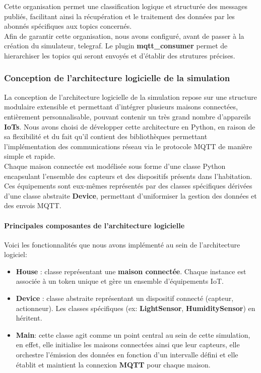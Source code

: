 \documentclass[10pt, a4paper]{report}
\begin{document}
	Cette organisation permet une classification logique et structurée des messages publiés, facilitant ainsi la récupération et le traitement des données par les abonnés spécifiques aux topics concernés.\\
	
	Afin de garantir cette organisation, nous avons configuré, avant de passer à la création du simulateur, telegraf. Le plugin \textbf{mqtt\_consumer} permet de hierarchiser les topics qui seront envoyés et d'établir des strutures précises.
	\subsubsection{Conception de l'architecture logicielle de la simulation}
	La conception de l'architecture logicielle de la simulation repose sur une structure modulaire extensible et permettant d'intégrer plusieurs maisons connectées, entièrement personnalisable, pouvant contenir un très grand nombre d'appareils \textbf{IoTs}. Nous avons choisi de développer cette architecture en Python, en raison de sa flexibilité et du fait qu'il contient des bibliothèques permettant l'implémentation des communications réseau via le protocole MQTT de manière simple et rapide.\\
	
	Chaque maison connectée est modélisée sous forme d'une classe Python encapsulant l'ensemble des capteurs et des dispositifs présents dans l'habitation. Ces équipements sont eux-mêmes représentés par des classes spécifiques dérivées d'une classe abstraite \textbf{Device}, permettant d'uniformiser la gestion des données et des envois MQTT.\\
	
	\paragraph{Principales composantes de l'architecture logicielle\\}
		Voici les fonctionnalités que nous avons implémenté au sein de l'architecture logiciel:

	\begin{itemize}
		\item \textbf{House} : classe représentant une \textbf{maison connectée}. Chaque instance est associée à un token unique et gère un ensemble d'équipements IoT.
		\item \textbf{Device} : classe abstraite représentant un dispositif connecté (capteur, actionneur). Les classes spécifiques (ex: \textbf{LightSensor}, \textbf{HumiditySensor}) en héritent.
		\item \textbf{Main}: cette classe agit comme un point central au sein de cette simulation, en effet, elle initialise les maisons connectées ainsi que leur capteurs, elle orchestre l'émission des données en fonction d'un intervalle défini et elle établit et maintient la connexion \textbf{MQTT} pour chaque maison. 
	\end{itemize}
	
\end{document}
